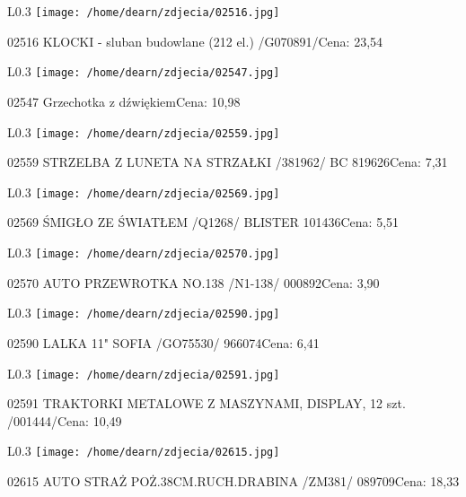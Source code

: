 \begin{wrapfigure}{L}{0.3\textwidth}
\texttt{[image: /home/dearn/zdjecia/02516.jpg]}
\end{wrapfigure}
02516 KLOCKI - sluban budowlane (212 el.) /G070891/Cena: 23,54\newline
\begin{wrapfigure}{L}{0.3\textwidth}
\texttt{[image: /home/dearn/zdjecia/02547.jpg]}
\end{wrapfigure}
02547 Grzechotka z dźwiękiemCena: 10,98\newline
\begin{wrapfigure}{L}{0.3\textwidth}
\texttt{[image: /home/dearn/zdjecia/02559.jpg]}
\end{wrapfigure}
02559 STRZELBA Z LUNETA NA STRZAŁKI /381962/ BC       819626Cena: 7,31\newline
\begin{wrapfigure}{L}{0.3\textwidth}
\texttt{[image: /home/dearn/zdjecia/02569.jpg]}
\end{wrapfigure}
02569 ŚMIGŁO ZE ŚWIATŁEM /Q1268/ BLISTER              101436Cena: 5,51\newline
\begin{wrapfigure}{L}{0.3\textwidth}
\texttt{[image: /home/dearn/zdjecia/02570.jpg]}
\end{wrapfigure}
02570 AUTO PRZEWROTKA NO.138 /N1-138/                 000892Cena: 3,90\newline
\begin{wrapfigure}{L}{0.3\textwidth}
\texttt{[image: /home/dearn/zdjecia/02590.jpg]}
\end{wrapfigure}
02590 LALKA 11" SOFIA   /GO75530/                     966074Cena: 6,41\newline
\begin{wrapfigure}{L}{0.3\textwidth}
\texttt{[image: /home/dearn/zdjecia/02591.jpg]}
\end{wrapfigure}
02591 TRAKTORKI METALOWE Z MASZYNAMI, DISPLAY, 12 szt. /001444/Cena: 10,49\newline
\begin{wrapfigure}{L}{0.3\textwidth}
\texttt{[image: /home/dearn/zdjecia/02615.jpg]}
\end{wrapfigure}
02615 AUTO STRAŻ POŻ.38CM.RUCH.DRABINA /ZM381/        089709Cena: 18,33\newline
